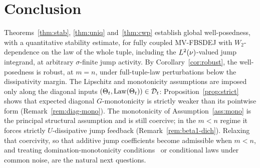 \section{Conclusion}\label{sec:conclusion}

Theorems~\ref{thm:stab}, \ref{thm:uniq} and~\ref{thm:cwp} establish global well-posedness, with a quantitative
stability estimate, for fully coupled MV-FBSDEJ with $W_2$-dependence on the law of the whole
tuple, including the $L^2(\nu)$-valued jump integrand, at arbitrary $\sigma$-finite jump activity.
By Corollary~\ref{cor:robust}, the well-posedness is robust, at $m=n$, under full-tuple-law
perturbations below the dissipativity margin. The Lipschitz and monotonicity assumptions are imposed only along the diagonal inputs
$(\Theta_t,\mathrm{Law}(\Theta_t))\in\mathcal D_t$:
Proposition~\ref{prop:strict} shows that expected diagonal $G$-monotonicity is strictly
weaker than its pointwise form (Remark~\ref{rem:diag-mono}). The monotonicity of
Assumption~\ref{ass:mono} is the principal structural assumption and is still coercive; in the $m<n$ regime it
forces strictly $U$-dissipative jump feedback (Remark~\ref{rem:beta1-dich}). Relaxing that coercivity, so that additive jump coefficients
become admissible when $m<n$, and treating domination-monotonicity
conditions~\cite{TianYu,WuHao} or conditional laws under common noise, are the natural next
questions.

